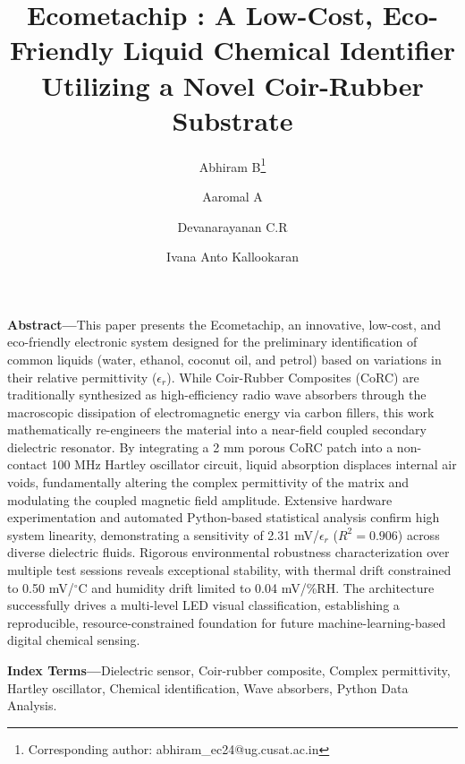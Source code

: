 \documentclass[11pt, a4paper]{article}
\begin{document}
\title{\Large\bfseries Ecometachip : A Low-Cost, Eco-Friendly Liquid Chemical Identifier Utilizing a Novel Coir-Rubber Substrate}
\author[1]{Abhiram B\thanks{Corresponding author: abhiram\_ec24@ug.cusat.ac.in}}
\author[1]{Aaromal A}
\author[1]{Devanarayanan C.R}
\author[1]{Ivana Anto Kallookaran}
\date{} %
\maketitle

\noindent\textbf{Abstract---}This paper presents the Ecometachip, an innovative, low-cost, and eco-friendly electronic system designed for the preliminary identification of common liquids (water, ethanol, coconut oil, and petrol) based on variations in their relative permittivity ($\epsilon_r$). While Coir-Rubber Composites (CoRC) are traditionally synthesized as high-efficiency radio wave absorbers through the macroscopic dissipation of electromagnetic energy via carbon fillers, this work mathematically re-engineers the material into a near-field coupled secondary dielectric resonator. By integrating a 2 mm porous CoRC patch into a non-contact 100 MHz Hartley oscillator circuit, liquid absorption displaces internal air voids, fundamentally altering the complex permittivity of the matrix and modulating the coupled magnetic field amplitude. Extensive hardware experimentation and automated Python-based statistical analysis confirm high system linearity, demonstrating a sensitivity of 2.31 mV/$\epsilon_r$ ($R^2 = 0.906$) across diverse dielectric fluids. Rigorous environmental robustness characterization over multiple test sessions reveals exceptional stability, with thermal drift constrained to 0.50 mV/$^\circ$C and humidity drift limited to 0.04 mV/\%RH. The architecture successfully drives a multi-level LED visual classification, establishing a reproducible, resource-constrained foundation for future machine-learning-based digital chemical sensing.

\vspace{0.4cm}
\noindent\textbf{Index Terms---}Dielectric sensor, Coir-rubber composite, Complex permittivity, Hartley oscillator, Chemical identification, Wave absorbers, Python Data Analysis.
\end{document}
